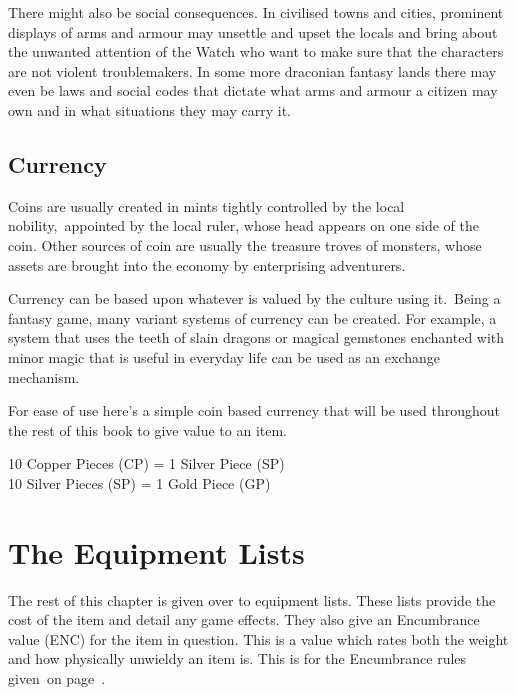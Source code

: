 There might also be social consequences. In civilised towns and cities, prominent displays of arms and armour may unsettle and upset the locals and bring about the unwanted attention of the Watch who want to make sure that the characters are not violent troublemakers. In some more draconian fantasy lands there may even be laws and social codes that dictate what arms and armour a citizen may own and in what situations they may carry it. 

\subsection{Currency}
Coins are usually created in mints tightly controlled by the local nobility, appointed by the local ruler, whose head appears on one side of the coin. Other sources of coin are usually the treasure troves of monsters, whose assets are brought into the economy by enterprising adventurers.

Currency can be based upon whatever is valued by the culture using it. Being a fantasy game, many variant systems of currency can be created. For example, a system that uses the teeth of slain dragons or magical gemstones enchanted with minor magic that is useful in everyday life can be used as an exchange mechanism.

For ease of use here’s a simple coin based currency that will be used throughout the rest of this book to give value to an item.

\vspace{1em}

\begin{rpg-table}[|X|]
	\hline
	10 Copper Pieces (CP) = 1 Silver Piece (SP)\\
	10 Silver Pieces (SP) = 1 Gold Piece (GP)\\
	\hline
\end{rpg-table}

\section{The Equipment Lists}
The rest of this chapter is given over to equipment lists. These lists provide the cost of the item and detail any game effects. They also give an Encumbrance value (ENC) for the item in question. This is a value which rates both the weight and how physically unwieldy an item is. This is for the Encumbrance rules given on page~\pageref{ssec:encumbrance}.

